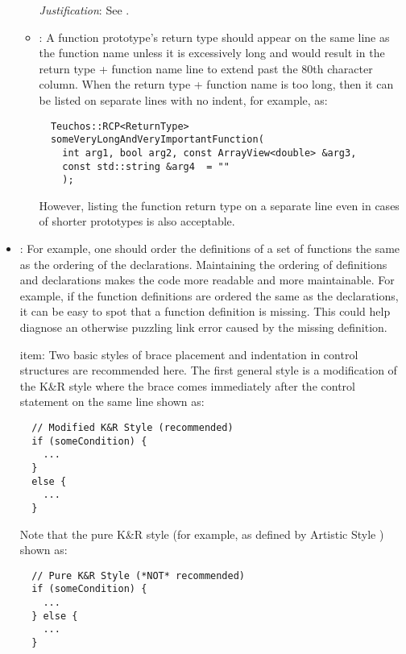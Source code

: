 \begin{itemize}
\begin{itemize}
  \textit{Justification}: See \cite[Section 31.1]{CodeComplete2nd04}.
  
  \item\FSCFunctionReturn: A function prototype's return type should appear
  on the same line as the function name unless it is excessively long and
  would result in the return type + function name line to extend past the 80th
  character column.  When the return type + function name is too long, then it
  can be listed on separate lines with no indent, for example, as:
  
  {\small\begin{verbatim}
  Teuchos::RCP<ReturnType>
  someVeryLongAndVeryImportantFunction(
    int arg1, bool arg2, const ArrayView<double> &arg3,
    const std::string &arg4  = ""
    );
  \end{verbatim}}

  However, listing the function return type on a separate line even in cases
  of shorter prototypes is also acceptable.

  \end{itemize}


\item\FSCOrderFunctionDefinitions: For example, one should order the
  definitions of a set of functions the same as the ordering of the
  declarations.  Maintaining the ordering of definitions and
  declarations makes the code more readable and more maintainable.
  For example, if the function definitions are ordered the same as the
  declarations, it can be easy to spot that a function definition is
  missing.  This could help diagnose an otherwise puzzling link error
  caused by the missing definition.

  item\FSCBracePlacement: Two basic styles of brace placement and
  indentation in control structures are recommended here.  The first
  general style is a modification of the K\&R style
  \cite{ArtisticStyle} where the brace comes immediately after the
  control statement on the same line shown as:

{\small\begin{verbatim}
  // Modified K&R Style (recommended)
  if (someCondition) {
    ...
  }
  else {
    ...
  }
\end{verbatim}}

Note that the pure K\&R style (for example, as defined by Artistic Style
\cite{ArtisticStyle}) shown as:

{\small\begin{verbatim}
  // Pure K&R Style (*NOT* recommended)
  if (someCondition) {
    ...
  } else {
    ...
  }
\end{verbatim}}


\end{itemize}
